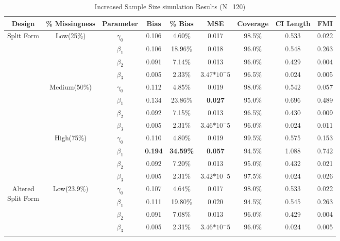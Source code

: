 \documentclass{svjour3}                     %
\begin{document}
\begin{table}[p]
	\centering
	\caption{Increased Sample Size simulation Results (N=120)}
	\setlength{\tabcolsep}{0.1cm}
	\label{tab:table4}
	\hspace*{-1cm}
	\begin{tabular}{c|c|c|cccccc}
		\toprule
		Design & \% Missingness & Parameter & Bias & \% Bias & MSE & Coverage & CI Length & FMI \\
		\midrule
		\multirow{12}{*}{Split Form}
		& \multirow{4}{*}{Low(25\%)}
		& $\gamma_0$ & 0.106 & 4.60\% & 0.017 & 98.5\% & 0.533 & 0.022 \\
		&& $\beta_1$ & 0.106 & 18.96\% & 0.018 & 96.0\% & 0.548 & 0.263 \\
		&& $\beta_2$ & 0.091 & 7.14\% & 0.013 & 96.0\% & 0.429 & 0.004 \\
		&& $\beta_3$ & 0.005 & 2.33\% & 3.47$*10^-5$ & 96.5\% & 0.024 & 0.005 \\ \cline{2-9} \noalign{\smallskip}
		&\multirow{4}{*}{Medium(50\%)}
		& $\gamma_0$ & 0.112 & 4.85\% & 0.019 & 98.0\% & 0.542 & 0.057 \\
		&& $\beta_1$ & 0.134 & 23.86\% & \textbf{0.027} & 95.0\% & 0.696 & 0.489 \\
		&& $\beta_2$ & 0.092 & 7.15\% & 0.013 & 96.5\% & 0.430 & 0.009 \\
		&& $\beta_3$ & 0.005 & 2.31\% & 3.46$*10^-5$ & 96.0\% & 0.024 & 0.011 \\ \cline{2-9} \noalign{\smallskip}
		& \multirow{4}{*}{High(75\%)}
		& $\gamma_0$ & 0.110 & 4.80\% & 0.019 & 99.5\% & 0.575 & 0.153 \\
		&& $\beta_1$ & \textbf{0.194} & \textbf{34.59\%} & \textbf{0.057} & 94.5\% & 1.088 & 0.742 \\
		&& $\beta_2$ & 0.092 & 7.20\% & 0.013 & 95.0\% & 0.432 & 0.021 \\
		&& $\beta_3$ & 0.005 & 2.31\% & 3.42$*10^-5$ & 97.5\% & 0.024 & 0.026 \\
		\midrule
		\midrule
		\multirow{12}{*}{\parbox{1.75cm}{Altered \\ Split Form}}
		& \multirow{4}{*}{Low(23.9\%)}
		& $\gamma_0$ & 0.107 & 4.64\% & 0.017 & 98.0\% & 0.533 & 0.022 \\
		&& $\beta_1$ & 0.111 & 19.80\% & 0.020 & 94.5\% & 0.545 & 0.263 \\
		&& $\beta_2$ & 0.091 & 7.08\% & 0.013 & 96.0\% & 0.429 & 0.004 \\
		&& $\beta_3$ & 0.005 & 2.31\% & 3.46$*10^-5$ & 96.0\% & 0.024 & 0.005 \\ \cline{2-9} \noalign{\smallskip}

\end{tabular}
\end{table}
\end{document}
